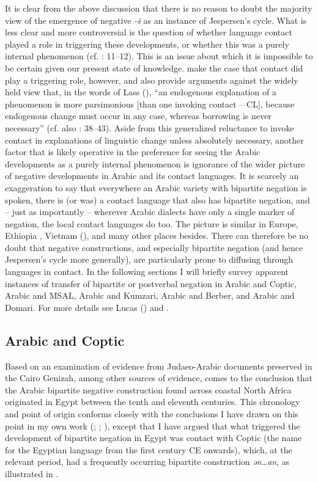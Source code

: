 \documentclass[output=paper]{langsci/langscibook}
\begin{document}
It is clear from the above discussion that there is no reason to doubt the majority view of the emergence of negative \textit{{}-š} as an instance of Jespersen’s cycle. What is less clear and more controversial is the question of whether language contact played a role in triggering these developments, or whether this was a purely internal phenomenon (cf. \citealt{Diem2014}: 11–12). This is an issue about which it is impossible to be certain given our present state of knowledge. \citet{LucasLash2010} make the case that contact did play a triggering role, however, and also provide arguments against the widely held view that, in the words of Lass (\citeyear[209]{Lass1997}), “an endogenous explanation of a phenomenon is more parsimonious [than one invoking contact – CL], because endogenous change must occur in any case, whereas borrowing is never necessary” (cf. also \citealt{Lucas2009}: 38–43). Aside from this generalized reluctance to invoke contact in explanations of linguistic change unless absolutely necessary, another factor that is likely operative in the preference for seeing the Arabic developments as a purely internal phenomenon is ignorance of the wider picture of negative developments in Arabic and its contact languages. It is scarcely an exaggeration to say that everywhere an Arabic variety with bipartite negation is spoken, there is (or was) a contact language that also has bipartite negation, and – just as importantly – wherever Arabic dialects have only a single marker of negation, the local contact languages do too. The picture is similar in Europe, Ethiopia \citep{Lucas2009}, Vietnam (\citealt{AuweraVossen2015}), and many other places besides. There can therefore be no doubt that negative constructions, and especially bipartite negation (and hence Jespersen’s cycle more generally), are particularly prone to diffusing through languages in contact. In the following sections I will briefly survey apparent instances of transfer of bipartite or postverbal negation in Arabic and Coptic, Arabic and MSAL, Arabic and Kumzari, Arabic and Berber, and Arabic and Domari. For more details see Lucas (\citeyear{Lucas2007,Lucas2009,Lucas2013}) and \citet{LucasLash2010}.



\subsection{Arabic and Coptic}


Based on an examination of evidence from Judaeo-Arabic documents preserved in the Cairo Genizah, among other sources of evidence, \citet{Diem2014} comes to the conclusion that the Arabic bipartite negative construction found across coastal North Africa originated in Egypt between the tenth and eleventh centuries. This chronology and point of origin conforms closely with the conclusions I have drawn on this point in my own work (\citealt{Lucas2007}; \citeyear{Lucas2009}; \citealt{LucasLash2010}), except that I have argued that what triggered the development of bipartite negation in Egypt was contact with Coptic (the name for the Egyptian language from the first century CE onwards), which, at the relevant period, had a frequently occurring bipartite construction \textit{ən…an}, as illustrated in .
\end{document}
